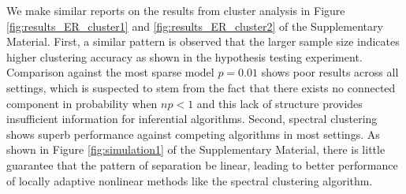 \documentclass[12pt]{article}
\begin{document}
We make similar reports on the results from cluster analysis in Figure \ref{fig:results_ER_cluster1} and \ref{fig:results_ER_cluster2} of the Supplementary Material. First, a similar pattern is observed that the larger sample size indicates higher clustering accuracy as shown in the hypothesis testing experiment. Comparison against the most sparse model $p=0.01$ shows poor results across all settings, which is suspected to stem from the fact that there exists no connected component in probability when $np < 1$ \citep{erdos_random_1959-1} and this lack of structure provides insufficient information for inferential algorithms. Second, spectral clustering shows superb performance against competing algorithms in most settings. As shown in Figure \ref{fig:simulation1} of the Supplementary Material, there is little guarantee that the pattern of separation be linear, leading to better performance of locally adaptive nonlinear methods like the spectral clustering algorithm. 
\end{document}

